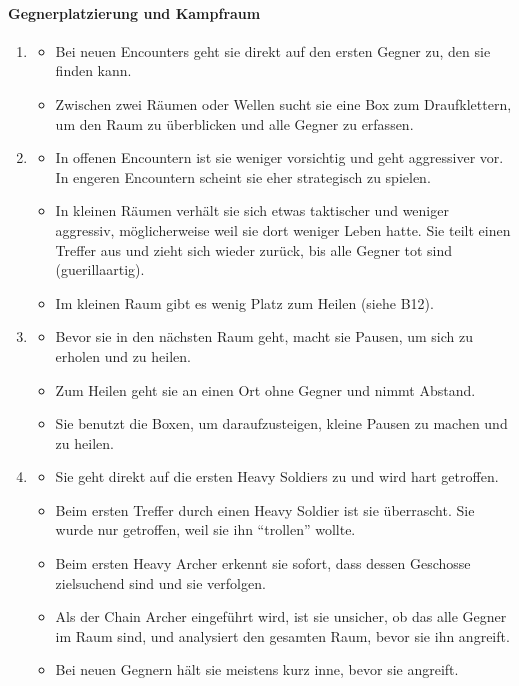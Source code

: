 \documentclass[../Main.tex]{subfiles}
\begin{document}
\paragraph{Gegnerplatzierung und Kampfraum}
\begin{enumerate}[label=\textbf{B\arabic*}, leftmargin=1.5cm, itemsep=0.8em, resume]
\item
    \begin{itemize}[nosep]
        \item Bei neuen Encounters geht sie direkt auf den ersten Gegner zu, den sie finden kann.
        \item Zwischen zwei Räumen oder Wellen sucht sie eine Box zum Draufklettern, um den Raum zu überblicken und alle Gegner zu erfassen.
    \end{itemize}

\item
    \begin{itemize}[nosep]
        \item In offenen Encountern ist sie weniger vorsichtig und geht aggressiver vor. In engeren Encountern scheint sie eher strategisch zu spielen.
        \item In kleinen Räumen verhält sie sich etwas taktischer und weniger aggressiv, möglicherweise weil sie dort weniger Leben hatte. Sie teilt einen Treffer aus und zieht sich wieder zurück, bis alle Gegner tot sind (guerillaartig).
        \item Im kleinen Raum gibt es wenig Platz zum Heilen (siehe B12).
    \end{itemize}

\item
    \begin{itemize}[nosep]
        \item Bevor sie in den nächsten Raum geht, macht sie Pausen, um sich zu erholen und zu heilen.
        \item Zum Heilen geht sie an einen Ort ohne Gegner und nimmt Abstand.
        \item Sie benutzt die Boxen, um daraufzusteigen, kleine Pausen zu machen und zu heilen.
    \end{itemize}

\item
    \begin{itemize}[nosep]
        \item Sie geht direkt auf die ersten Heavy Soldiers zu und wird hart getroffen.
        \item Beim ersten Treffer durch einen Heavy Soldier ist sie überrascht. Sie wurde nur getroffen, weil sie ihn \enquote{trollen} wollte.
        \item Beim ersten Heavy Archer erkennt sie sofort, dass dessen Geschosse zielsuchend sind und sie verfolgen.
        \item Als der Chain Archer eingeführt wird, ist sie unsicher, ob das alle Gegner im Raum sind, und analysiert den gesamten Raum, bevor sie ihn angreift.
        \item Bei neuen Gegnern hält sie meistens kurz inne, bevor sie angreift.
    \end{itemize}
\end{enumerate}
\end{document}
